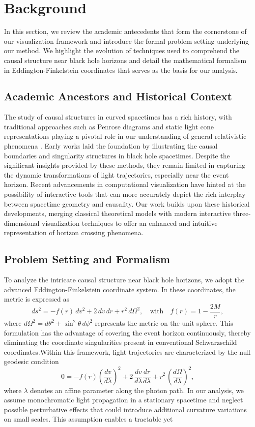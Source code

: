 \documentclass{article}
\begin{document}
\section{Background}In this section, we review the academic antecedents that form the cornerstone of our visualization framework and introduce the formal problem setting underlying our method. We highlight the evolution of techniques used to comprehend the causal structure near black hole horizons and detail the mathematical formalism in Eddington-Finkelstein coordinates that serves as the basis for our analysis.\subsection{Academic Ancestors and Historical Context}The study of causal structures in curved spacetimes has a rich history, with traditional approaches such as Penrose diagrams and static light cone representations playing a pivotal role in our understanding of general relativistic phenomena \cite{ref1}. Early works laid the foundation by illustrating the causal boundaries and singularity structures in black hole spacetimes. Despite the significant insights provided by these methods, they remain limited in capturing the dynamic transformations of light trajectories, especially near the event horizon. Recent advancements in computational visualization have hinted at the possibility of interactive tools that can more accurately depict the rich interplay between spacetime geometry and causality. Our work builds upon these historical developments, merging classical theoretical models with modern interactive three-dimensional visualization techniques to offer an enhanced and intuitive representation of horizon crossing phenomena.\subsection{Problem Setting and Formalism}To analyze the intricate causal structure near black hole horizons, we adopt the advanced Eddington-Finkelstein coordinate system. In these coordinates, the metric is expressed as\begin{equation}ds^2 = -f(r)\, dv^2 + 2\, dv\, dr + r^2\, d\Omega^2, \quad \text{with} \quad f(r)=1-\frac{2M}{r},\end{equation}where \(d\Omega^2 = d\theta^2+\sin^2\theta\, d\phi^2\) represents the metric on the unit sphere. This formulation has the advantage of covering the event horizon continuously, thereby eliminating the coordinate singularities present in conventional Schwarzschild coordinates.Within this framework, light trajectories are characterized by the null geodesic condition\begin{equation}0 = -f(r)\left(\frac{dv}{d\lambda}\right)^2 + 2\,\frac{dv}{d\lambda}\frac{dr}{d\lambda} + r^2\,\left(\frac{d\Omega}{d\lambda}\right)^2, \label{eq:nullgeodesic}\end{equation}where \(\lambda\) denotes an affine parameter along the photon path. In our analysis, we assume monochromatic light propagation in a stationary spacetime and neglect possible perturbative effects that could introduce additional curvature variations on small scales. This assumption enables a tractable yet 
\end{document}
